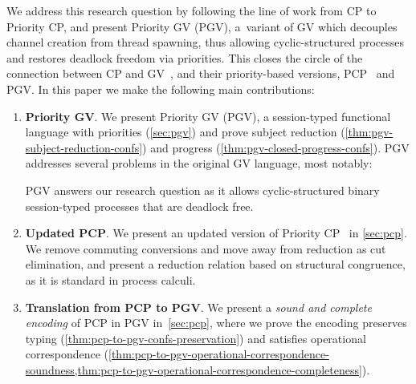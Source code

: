 \documentclass[main.tex]{subfiles}
\begin{document}
We address this research question by following the line of work from CP to Priority CP, and present
Priority GV (PGV), a~variant of GV which decouples channel creation from thread spawning, thus allowing cyclic-structured processes and restores deadlock freedom via priorities. This closes the circle of the connection between CP and GV~\cite{wadler14}, and their priority-based versions, PCP~\cite{dardhagay18} and PGV.%
In this paper we make the following main contributions:
\begin{enumerate}
	\item \textbf{Priority GV}. We present Priority GV (PGV), a session-typed functional language with priorities (\cref{sec:pgv}) and prove subject reduction (\cref{thm:pgv-subject-reduction-confs}) and progress (\cref{thm:pgv-closed-progress-confs}).
	PGV addresses several problems in the original GV language, most notably:
	PGV answers our research question as it allows cyclic-structured binary session-typed processes that are deadlock free.
	\item \textbf{Updated PCP}. We present an updated version of Priority CP~\cite{dardhagay18} in \cref{sec:pcp}. We remove commuting conversions and move away from reduction as cut elimination, and present a reduction relation based on structural congruence, as it is standard in process calculi.
	\item \textbf{Translation from PCP to PGV}. We present a \emph{sound and complete encoding} of PCP in PGV in~\cref{sec:pcp}, where we prove the encoding preserves typing (\cref{thm:pcp-to-pgv-confs-preservation}) and satisfies operational correspondence (\cref{thm:pcp-to-pgv-operational-correspondence-soundness,thm:pcp-to-pgv-operational-correspondence-completeness}).
\end{enumerate}
\end{document}

